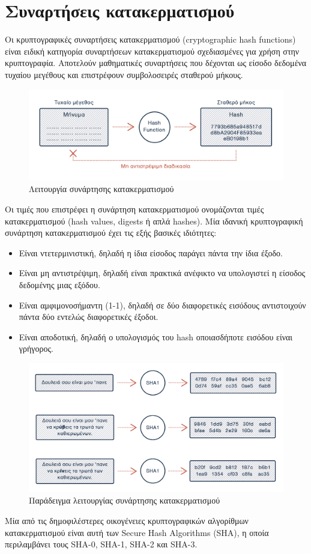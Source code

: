 \section{Συναρτήσεις κατακερματισμού} \label{section:2-1-hash-functions}

Οι κρυπτογραφικές συναρτήσεις κατακερματισμού (cryptographic hash functions) είναι ειδική κατηγορία συναρτήσεων κατακερματισμού σχεδιασμένες για χρήση στην κρυπτογραφία. Αποτελούν μαθηματικές συναρτήσεις που δέχονται ως είσοδο δεδομένα τυχαίου μεγέθους και επιστρέφουν συμβολοσειρές σταθερού μήκους.

\begin{figure}[H]
	\centering
	\includegraphics[width=15cm]{assets/figures/hash-functions-1.png}
	\caption{Λειτουργία συνάρτησης κατακερματισμού}
\end{figure}

Οι τιμές που επιστρέφει η συνάρτηση κατακερματισμού ονομάζονται τιμές κατακερματισμού (hash values, digests ή απλά hashes). Μία ιδανική κρυπτογραφική συνάρτηση κατακερματισμού έχει τις εξής βασικές ιδιότητες:

\begin{itemize}
	\item Είναι ντετερμινιστική, δηλαδή η ίδια είσοδος παράγει πάντα την ίδια έξοδο.
	\item Είναι μη αντιστρέψιμη, δηλαδή είναι πρακτικά ανέφικτο να υπολογιστεί η είσοδος δεδομένης μιας εξόδου.
	\item Είναι αμφιμονοσήμαντη (1-1), δηλαδή σε δύο διαφορετικές εισόδους αντιστοιχούν πάντα δύο εντελώς διαφορετικές έξοδοι.
	\item Είναι αποδοτική, δηλαδή ο υπολογισμός του hash οποιασδήποτε εισόδου είναι γρήγορος.
\end{itemize}

\begin{figure}[H]
	\centering
	\includegraphics[width=15cm]{assets/figures/hash-functions-2.png}
	\caption{Παράδειγμα λειτουργίας συνάρτησης κατακερματισμού}
\end{figure}

Μία από τις δημοφιλέστερες οικογένειες κρυπτογραφικών αλγορίθμων κατακερματισμού είναι αυτή των Secure Hash Algorithms (SHA), η οποία περιλαμβάνει τους SHA-0, SHA-1, SHA-2 και SHA-3.